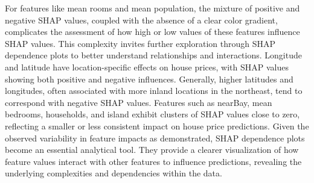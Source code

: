 \documentclass[12pt]{article}
\begin{document}
For features like mean rooms and mean population, the mixture of positive and negative SHAP values, coupled with the absence of a clear color gradient, complicates the assessment of how high or low values of these features influence SHAP values.
This complexity invites further exploration through SHAP dependence plots to better understand relationships and interactions. 
Longitude and latitude have location-specific effects on house prices, with SHAP values showing both positive and negative influences. Generally, higher latitudes and longitudes, often associated with more inland locations in the northeast, tend to correspond with negative SHAP values.
Features such as nearBay, mean bedrooms, households, and island exhibit clusters of SHAP values close to zero, reflecting a smaller or less consistent impact on house price predictions.
Given the observed variability in feature impacts as demonstrated, SHAP dependence plots become an essential analytical tool. They provide a clearer visualization of how feature values interact with other features to influence predictions, revealing the underlying complexities and dependencies within the data.
\end{document}
